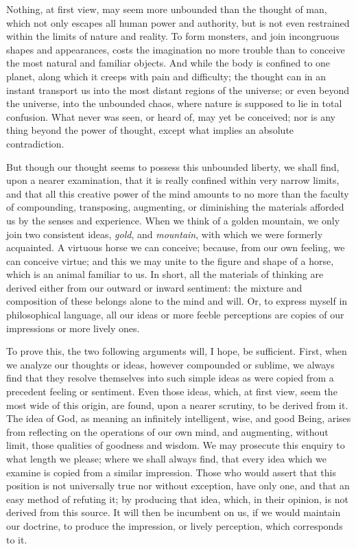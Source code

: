 \documentclass[]{article}
\begin{document}
\begin{sectionbody}
\humeparagraph  Nothing, at first view, may seem more unbounded than the thought of man, which not only escapes all human power and authority, but is not even restrained within the limits of nature and reality. To form monsters, and join incongruous shapes and appearances, costs the imagination no more trouble than to conceive the most natural and familiar objects. And while the body is confined to one planet, along which it creeps with pain and difficulty; the thought can in an instant transport us into the most distant regions of the universe; or even beyond the universe, into the unbounded chaos, where nature is supposed to lie in total confusion. What never was seen, or heard of, may yet be conceived; nor is any thing beyond the power of thought, except what implies an absolute contradiction.

\humeparagraph  But though our thought seems to possess this unbounded liberty, we shall find, upon a nearer examination, that it is really confined within very narrow limits, and that all this creative power of the mind amounts to no more than the faculty of compounding, transposing, augmenting, or diminishing the materials afforded us by the senses and experience. When we think of a golden mountain, we only join two consistent ideas, \emph{gold}, and \emph{mountain}, with which we were formerly acquainted. A virtuous horse we can conceive; because, from our own feeling, we can conceive virtue; and this we may unite to the figure and shape of a horse, which is an animal familiar to us. In short, all the materials of thinking are derived either from our outward or inward sentiment: the mixture and composition of these belongs alone to the mind and will. Or, to express myself in philosophical language, all our ideas or more feeble perceptions are copies of our impressions or more lively ones.

\humeparagraph  To prove this, the two following arguments will, I hope, be sufficient. First, when we analyze our thoughts or ideas, however compounded or sublime, we always find that they resolve themselves into such simple ideas as were copied from a precedent feeling or sentiment. Even those ideas, which, at first view, seem the most wide of this origin, are found, upon a nearer scrutiny, to be derived from it. The idea of God, as meaning an infinitely intelligent, wise, and good Being, arises from reflecting on the operations of our own mind, and augmenting, without limit, those qualities of goodness and wisdom. We may prosecute this enquiry to what length we please; where we shall always find, that every idea which we examine is copied from a similar impression. Those who would assert that this position is not universally true nor without exception, have only one, and that an easy method of refuting it; by producing that idea, which, in their opinion, is not derived from this source. It will then be incumbent on us, if we would maintain our doctrine, to produce the impression, or lively perception, which corresponds to it.


\end{sectionbody}
\end{document}
